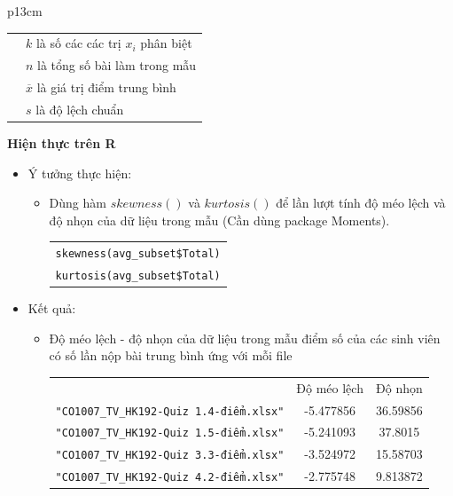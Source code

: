 \documentclass[a4paper]{article}
\theoremstyle{definition}
\begin{document}
\begin{enumerate}[a)]
\begin{itemize}
\begin{itemize}
\begin{center}
\begin{tabular}{p{13cm}}
\begin{tabular}{l l}
                        & $k$ là số các các trị $x_i$ phân biệt\\
                        & $n$ là tổng số bài làm trong mẫu\\
                        & $\overline{x}$ là giá trị điểm trung bình\\
                        & $s$ là độ lệch chuẩn
                    \end{tabular}
                \end{tabular}
            \end{center}
        \end{itemize}
    \end{itemize}
    \bf Hiện thực trên R\normalfont
    \begin{itemize}
        \item Ý tưởng thực hiện:
        \begin{itemize}
            \item Dùng hàm $skewness()$ và $kurtosis()$ để lần lượt tính độ méo lệch và độ nhọn của dữ liệu trong mẫu (Cần dùng package Moments).
            \begin{center}
                \begin{tabular}{p{13cm}}
                    \texttt{skewness(avg\_subset\$Total)}\\
                    \texttt{kurtosis(avg\_subset\$Total)}
                \end{tabular}
            \end{center}
        \end{itemize}
        \item Kết quả:
        \begin{itemize}
            \item Độ méo lệch - độ nhọn của dữ liệu trong mẫu điểm số của các sinh viên có số lần nộp bài trung bình ứng với mỗi file
            \begin{center}
                \begin{tabular}{l c c}
                     & Độ méo lệch & Độ nhọn\\
                     \texttt{"CO1007\_TV\_HK192-Quiz 1.4-điểm.xlsx"} & -5.477856 & 36.59856  \\ 
                     \texttt{"CO1007\_TV\_HK192-Quiz 1.5-điểm.xlsx"} & -5.241093 & 37.8015\\ 
                     \texttt{"CO1007\_TV\_HK192-Quiz 3.3-điểm.xlsx"} & -3.524972 & 15.58703\\ 
                     \texttt{"CO1007\_TV\_HK192-Quiz 4.2-điểm.xlsx"} & -2.775748 & 9.813872\\ 

\end{tabular}
\end{center}
\end{itemize}
\end{itemize}
\end{enumerate}
\end{document}
